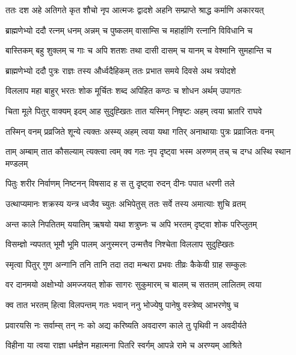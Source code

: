 
\twolineshloka
{ततः दश अहे अतिगते कृत शौचो नृप आत्मजः}
{द्वादशे अहनि सम्प्राप्ते श्राद्ध कर्माणि अकारयत्} %

\twolineshloka
{ब्राह्मणेभ्यो ददौ रत्नम् धनम् अन्नम् च पुष्कलम्}
{वासाम्सि च महार्हाणि रत्नानि विविधानि च} %

\twolineshloka
{बास्तिकम् बहु शुक्लम् च गाः च अपि शतशः तथा}
{दासी दासम् च यानम् च वेश्मानि सुमहान्ति च} %

\twolineshloka
{ब्राह्मणेभ्यो ददौ पुत्रः राज्ञः तस्य और्ध्वदैहिकम्}
{ततः प्रभात समये दिवसे अथ त्रयोदशे} %

\twolineshloka
{विललाप महा बाहुर् भरतः शोक मूर्चितः}
{शब्द अपिहित कण्ठः च शोधन अर्थम् उपागतः} %

\twolineshloka
{चिता मूले पितुर् वाक्यम् इदम् आह सुदुह्खितः}
{तात यस्मिन् निषृष्टः अहम् त्वया भ्रातरि राघवे} %

\twolineshloka
{तस्मिन् वनम् प्रव्रजिते शून्ये त्यक्तः अस्म्य् अहम् त्वया}
{यथा गतिर् अनाथायाः पुत्रः प्रव्राजितः वनम्} %

\twolineshloka
{ताम् अम्बाम् तात कौसल्याम् त्यक्त्वा त्वम् क्व गतः नृप}
{दृष्ट्वा भस्म अरुणम् तच् च दग्ध अस्थि स्थान मण्डलम्} %

\twolineshloka
{पितुः शरीर निर्वाणम् निष्टनन् विषसाद ह}
{स तु दृष्ट्वा रुदन् दीनः पपात धरणी तले} %

\twolineshloka
{उत्थाप्यमानः शक्रस्य यन्त्र ध्वजैव च्युतः}
{अभिपेतुस् ततः सर्वे तस्य अमात्याः शुचि व्रतम्} %

\twolineshloka
{अन्त काले निपतितम् ययातिम् ऋषयो यथा}
{शत्रुघ्नः च अपि भरतम् दृष्ट्वा शोक परिप्लुतम्} %

\twolineshloka
{विसम्ज्ञो न्यपतत् भूमौ भूमि पालम् अनुस्मरन्}
{उन्मत्तैव निश्चेता विललाप सुदुह्खितः} %

\twolineshloka
{स्मृत्वा पितुर् गुण अन्गानि तनि तानि तदा तदा}
{मन्थरा प्रभवः तीव्रः कैकेयी ग्राह सम्कुलः} %

\twolineshloka
{वर दानमयो अक्षोभ्यो अमज्जयत् शोक सागरः}
{सुकुमारम् च बालम् च सततम् लालितम् त्वया} %

\twolineshloka
{क्व तात भरतम् हित्वा विलपन्तम् गतः भवान्}
{ननु भोज्येषु पानेषु वस्त्रेष्व् आभरणेषु च} %

\twolineshloka
{प्रवारयसि नः सर्वाम्स् तन् नः को अद्य करिष्यति}
{अवदारण काले तु पृथिवी न अवदीर्यते} %

\twolineshloka
{विहीना या त्वया राज्ञा धर्मज्ञेन महात्मना}
{पितरि स्वर्गम् आपन्ने रामे च अरण्यम् आश्रिते} %

